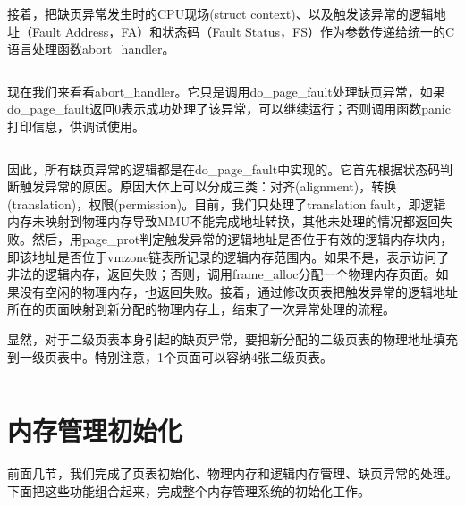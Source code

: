 \documentclass[main.tex]{subfiles}
\begin{document}
\begin{CJK*}{UTF8}{song}
\par
接着，把缺页异常发生时的CPU现场(struct context)、以及触发该异常的逻辑地址（Fault Address，FA）和状态码（Fault Status，FS）作为参数传递给统一的C语言处理函数abort\_handler。

\begin{code}
\label{code:4-19}
\inputminted[firstline=157,lastline=178,linenos,numbersep=5pt,frame=lines,framesep=2mm]{gas}{src/chapter04/kernel/entry.S}
\end{code}

现在我们来看看abort\_handler。它只是调用do\_page\_fault处理缺页异常，如果do\_page\_fault返回0表示成功处理了该异常，可以继续运行；否则调用函数panic打印信息，供调试使用。

\begin{code}
\label{code:4-20}
\inputminted[firstline=321,lastline=327,linenos,numbersep=5pt,frame=lines,framesep=2mm]{c}{src/chapter04/kernel/machdep.c}
\end{code}

因此，所有缺页异常的逻辑都是在do\_page\_fault中实现的。它首先根据状态码判断触发异常的原因。原因大体上可以分成三类：对齐(alignment)，转换(translation)，权限(permission)。目前，我们只处理了translation fault，即逻辑内存未映射到物理内存导致MMU不能完成地址转换，其他未处理的情况都返回失败。然后，用page\_prot判定触发异常的逻辑地址是否位于有效的逻辑内存块内，即该地址是否位于vmzone链表所记录的逻辑内存范围内。如果不是，表示访问了非法的逻辑内存，返回失败；否则，调用frame\_alloc分配一个物理内存页面。如果没有空闲的物理内存，也返回失败。接着，通过修改页表把触发异常的逻辑地址所在的页面映射到新分配的物理内存上，结束了一次异常处理的流程。

\par
显然，对于二级页表本身引起的缺页异常，要把新分配的二级页表的物理地址填充到一级页表中。特别注意，1个页面可以容纳4张二级页表。

\begin{code}
\label{code:4-21}
\inputminted[firstline=248,lastline=319,linenos,numbersep=5pt,frame=lines,framesep=2mm]{c}{src/chapter04/kernel/machdep.c}
\end{code}

\section{内存管理初始化}
前面几节，我们完成了页表初始化、物理内存和逻辑内存管理、缺页异常的处理。下面把这些功能组合起来，完成整个内存管理系统的初始化工作。


\end{CJK*}
\end{document}
